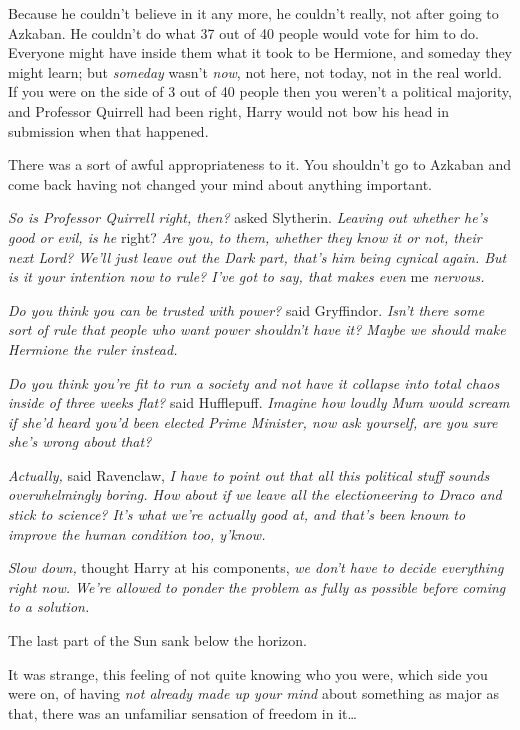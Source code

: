 Because he couldn't believe in it any more, he couldn't really, not after going 
to Azkaban. He couldn't do what 37 out of 40 people would vote for him to do. 
Everyone might have inside them what it took to be Hermione, and someday they 
might learn; but \emph{someday} wasn't \emph{now}, not here, not today, not in 
the real world. If you were on the side of 3 out of 40 people then you weren't 
a political majority, and Professor Quirrell had been right, Harry would not 
bow his head in submission when that happened.

There was a sort of awful appropriateness to it. You shouldn't go to Azkaban 
and come back having not changed your mind about anything important.

\emph{So is Professor Quirrell right, then?} asked Slytherin. \emph{Leaving out 
whether he's good or evil, is he} right?\emph{ Are you, to them, whether they 
know it or not, their next Lord? We'll just leave out the Dark part, that's him 
being cynical again. But is it your intention now to rule? I've got to say, 
that makes even} me\emph{ nervous.}

\emph{Do you think you can be trusted with power?} said Gryffindor. \emph{Isn't 
there some sort of rule that people who want power shouldn't have it? Maybe we 
should make Hermione the ruler instead.\\
}

\emph{Do you think you're fit to run a society and not have it collapse into 
total chaos inside of three weeks flat?} said Hufflepuff. \emph{Imagine how 
loudly Mum would scream if she'd heard you'd been elected Prime Minister, now 
ask yourself, are you sure she's wrong about that?}

\emph{Actually,} said Ravenclaw, \emph{I have to point out that all this 
political stuff sounds overwhelmingly boring. How about if we leave all the 
electioneering to Draco and stick to science? It's what we're actually good at, 
and that's been known to improve the human condition too, y'know.}

\emph{Slow down,} thought Harry at his components,\emph{ we don't have to 
decide everything right now. We're allowed to ponder the problem as fully as 
possible before coming to a solution.}

The last part of the Sun sank below the horizon.

It was strange, this feeling of not quite knowing who you were, which side you 
were on, of having \emph{not already made up your mind} about something as 
major as that, there was an unfamiliar sensation of freedom in it{\ldots}

